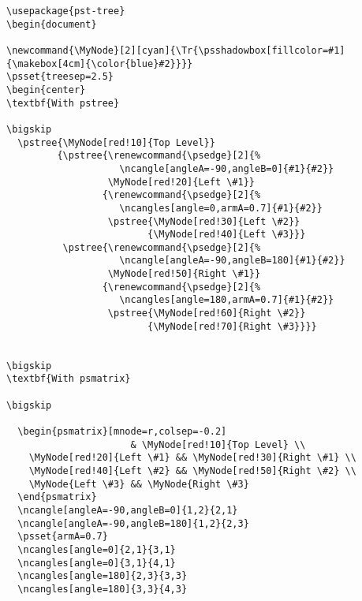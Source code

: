 \documentclass{article}
\begin{document}
\clearpage
\small
\begin{verbatim}
\usepackage{pst-tree}
\begin{document}

\newcommand{\MyNode}[2][cyan]{\Tr{\psshadowbox[fillcolor=#1]{\makebox[4cm]{\color{blue}#2}}}}
\psset{treesep=2.5}
\begin{center}
\textbf{With pstree}

\bigskip
  \pstree{\MyNode[red!10]{Top Level}}
         {\pstree{\renewcommand{\psedge}[2]{%
                    \ncangle[angleA=-90,angleB=0]{#1}{#2}}
                  \MyNode[red!20]{Left \#1}}
                 {\renewcommand{\psedge}[2]{%
                    \ncangles[angle=0,armA=0.7]{#1}{#2}}
                  \pstree{\MyNode[red!30]{Left \#2}}
                         {\MyNode[red!40]{Left \#3}}}
          \pstree{\renewcommand{\psedge}[2]{%
                    \ncangle[angleA=-90,angleB=180]{#1}{#2}}
                  \MyNode[red!50]{Right \#1}}
                 {\renewcommand{\psedge}[2]{%
                    \ncangles[angle=180,armA=0.7]{#1}{#2}}
                  \pstree{\MyNode[red!60]{Right \#2}}
                         {\MyNode[red!70]{Right \#3}}}}


\bigskip
\textbf{With psmatrix}

\bigskip

  \begin{psmatrix}[mnode=r,colsep=-0.2]
                      & \MyNode[red!10]{Top Level} \\
    \MyNode[red!20]{Left \#1} && \MyNode[red!30]{Right \#1} \\
    \MyNode[red!40]{Left \#2} && \MyNode[red!50]{Right \#2} \\
    \MyNode{Left \#3} && \MyNode{Right \#3}
  \end{psmatrix}
  \ncangle[angleA=-90,angleB=0]{1,2}{2,1}
  \ncangle[angleA=-90,angleB=180]{1,2}{2,3}
  \psset{armA=0.7}
  \ncangles[angle=0]{2,1}{3,1}
  \ncangles[angle=0]{3,1}{4,1}
  \ncangles[angle=180]{2,3}{3,3}
  \ncangles[angle=180]{3,3}{4,3}
\end{verbatim}
\end{document}
